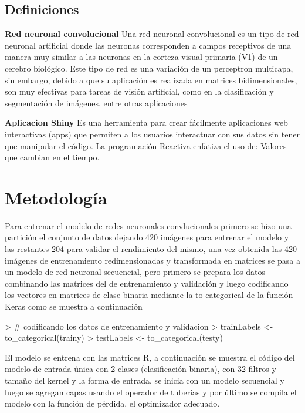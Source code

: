 \documentclass[11pt,twoside]{article}
\begin{document}
\subsection*{Definiciones}

\textbf{Red neuronal convolucional}
Una red neuronal convolucional es un tipo de red neuronal artificial donde las neuronas corresponden a campos receptivos de una manera muy similar a las neuronas en la corteza visual primaria (V1) de un cerebro biológico. Este tipo de red es una variación de un perceptron multicapa, sin embargo, debido a que su aplicación es realizada en matrices bidimensionales, son muy efectivas para tareas de visión artificial, como en la clasificación y segmentación de imágenes, entre otras aplicaciones 


\textbf{Aplicacion  Shiny}
Es una herramienta para crear fácilmente aplicaciones web interactivas (apps) que permiten a los usuarios interactuar con sus datos sin tener que manipular el código. La programación Reactiva enfatiza el uso de: Valores que cambian en el tiempo. 



\section*{Metodología}

Para entrenar el modelo de redes neuronales convlucionales primero se hizo una partición el conjunto de datos dejando 420 imágenes para entrenar el modelo y las restantes 204 para validar el rendimiento del mismo, una vez obtenida las 420 imágenes de entrenamiento redimensionadas y transformada en matrices se pasa a un modelo de red neuronal secuencial,
pero primero se prepara los datos combinando las matrices del de entrenamiento y validación y luego codificando los vectores en matrices de clase binaria mediante la to categorical de la función Keras como se muestra a continuación


\begin{Schunk}
\begin{Sinput}
> # codificando los datos de entrenamiento y validacion 
> trainLabels <- to_categorical(trainy)
> testLabels <- to_categorical(testy)
\end{Sinput}
\end{Schunk}


El modelo se entrena con las matrices R,  a continuación se muestra el código del modelo de entrada única con 2 clases (clasificación binaria), con 32 filtros y tamaño del kernel y la forma de entrada, se inicia con un modelo secuencial y luego se agregan capas usando el operador de tuberías y por último se compila el modelo con la función de pérdida, el optimizador
adecuado.
\end{document}

